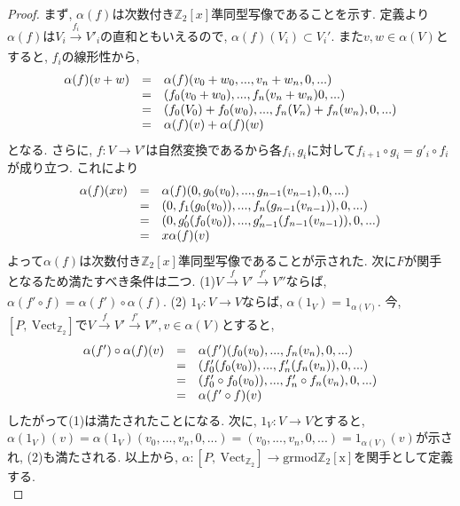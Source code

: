 \documentclass[a4paper]{jsarticle}
\theoremstyle{definition}
\newcommand{\Fun}[2]{[#1,~#2]}
\newcommand{\Vect}{{\mathrm{Vect}}}
\newcommand{\grmodZ}{{\mathrm{grmod \mathbb{Z}_2[x]}}}
\begin{document}
\begin{proof}
    まず, $\alpha(f)$は次数付き$\mathbb{Z}_2[x]$準同型写像であることを示す. 定義より$\alpha(f)$は$V_i\xrightarrow[]{f_i} V'_i$の直和ともいえるので, $\alpha(f)(V_i)\subset V_i'$. また$ v, w\in\alpha(V)$とすると, $f_i$の線形性から, 
\begin{equation}
    \begin{array}{lll}
      \alpha(f)(v+w)   &  =&\alpha(f)(v_0+w_0,...,v_n+w_n,0,...) \\
         &  =&(f_0(v_0+w_0),...,f_n(v_n+w_n)0,...)\\
         &  =&(f_0(V_0)+f_0(w_0),...,f_n(V_n)+f_n(w_n),0,...)\\
         &  =&\alpha(f)(v)+\alpha(f)(w)\notag
    \end{array}
\end{equation}
となる. さらに, $f:V\rightarrow V'$は自然変換であるから各$f_i, g_i$に対して$f_{i+1}\circ g_i=g'_i\circ f_{i}$が成り立つ. これにより
\begin{equation}
    \begin{array}{lll}
      \alpha(f)(xv)   &  =&\alpha(f)(0, g_0(v_0),..., g_{n-1}(v_{n-1}),0,...) \\
         &  =&(0, f_1(g_0(v_0)),..., f_n(g_{n-1}(v_{n-1})),0,...)\\
         &  =&(0, g'_0(f_0(v_0)),..., g'_{n-1}(f_{n-1}(v_{n-1})),0,...)\\
         &  =& x\alpha(f)(v) \notag
    \end{array}
\end{equation}
よって$\alpha(f)$は次数付き$\mathbb{Z}_2[x]$準同型写像であることが示された. 
次に$F$が関手となるため満たすべき条件は二つ. (1)$V\xrightarrow[]{f}V'\xrightarrow[]{f'}V''$ならば, $\alpha(f'\circ f) = \alpha(f')\circ \alpha(f)$. (2) $1_V:V\rightarrow V$ならば, $\alpha(1_V)=1_{\alpha(V)}$. 今, $\Fun{P}{\Vect_{\mathbb{Z}_2}}$で$V\xrightarrow[]{f}V'\xrightarrow[]{f'}V'', v\in\alpha(V)$とすると, 
\begin{equation}
    \begin{array}{lll}
      \alpha(f')\circ \alpha(f)(v)   &  =&\alpha(f')(f_0(v_0), ..., f_n(v_n),0,...) \\
         &  =&(f'_0(f_0(v_0)), ..., f'_n(f_n(v_n)),0,...)\\
         &  =&(f'_0\circ f_0(v_0)), ..., f'_n\circ f_n(v_n),0,...)\\
         &  =&\alpha(f'\circ f)(v)\notag
    \end{array}
\end{equation}
したがって(1)は満たされたことになる. 次に, $1_V:V\rightarrow V$とすると, $\alpha(1_V)(v)=\alpha(1_V)(v_0, ..., v_n,0,...)=(v_0, ..., v_n,0,...)=1_{\alpha(V)}(v)$が示され, (2)も満たされる. 以上から, $\alpha:\Fun{P}{\Vect_{\mathbb{Z}_2}}\rightarrow \grmodZ$を関手として定義する.\\
\end{proof}
 
\end{document}
